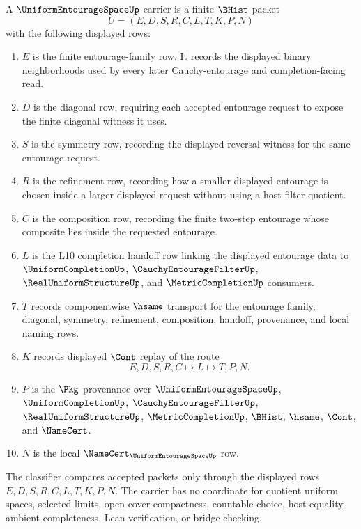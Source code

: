 \begin{definition}
\label{def:uniform-entourage-space-carrier}
A $\UniformEntourageSpaceUp$ carrier is a finite $\BHist$ packet
$$
U=(E,D,S,R,C,L,T,K,P,N)
$$
with the following displayed rows:
\begin{enumerate}
\item $E$ is the finite entourage-family row. It records the displayed binary neighborhoods used by every later Cauchy-entourage and completion-facing read.
\item $D$ is the diagonal row, requiring each accepted entourage request to expose the finite diagonal witness it uses.
\item $S$ is the symmetry row, recording the displayed reversal witness for the same entourage request.
\item $R$ is the refinement row, recording how a smaller displayed entourage is chosen inside a larger displayed request without using a host filter quotient.
\item $C$ is the composition row, recording the finite two-step entourage whose composite lies inside the requested entourage.
\item $L$ is the L10 completion handoff row linking the displayed entourage data to $\UniformCompletionUp$, $\CauchyEntourageFilterUp$, $\RealUniformStructureUp$, and $\MetricCompletionUp$ consumers.
\item $T$ records componentwise $\hsame$ transport for the entourage family, diagonal, symmetry, refinement, composition, handoff, provenance, and local naming rows.
\item $K$ records displayed $\Cont$ replay of the route
$$
E,D,S,R,C \longmapsto L \longmapsto T,P,N .
$$
\item $P$ is the $\Pkg$ provenance over $\UniformEntourageSpaceUp$, $\UniformCompletionUp$, $\CauchyEntourageFilterUp$, $\RealUniformStructureUp$, $\MetricCompletionUp$, $\BHist$, $\hsame$, $\Cont$, and $\NameCert$.
\item $N$ is the local $\NameCert_{\UniformEntourageSpaceUp}$ row.
\end{enumerate}
The classifier compares accepted packets only through the displayed rows $E,D,S,R,C,L,T,K,P,N$. The carrier has no coordinate for quotient uniform spaces, selected limits, open-cover compactness, countable choice, host equality, ambient completeness, Lean verification, or bridge checking.
\end{definition}

